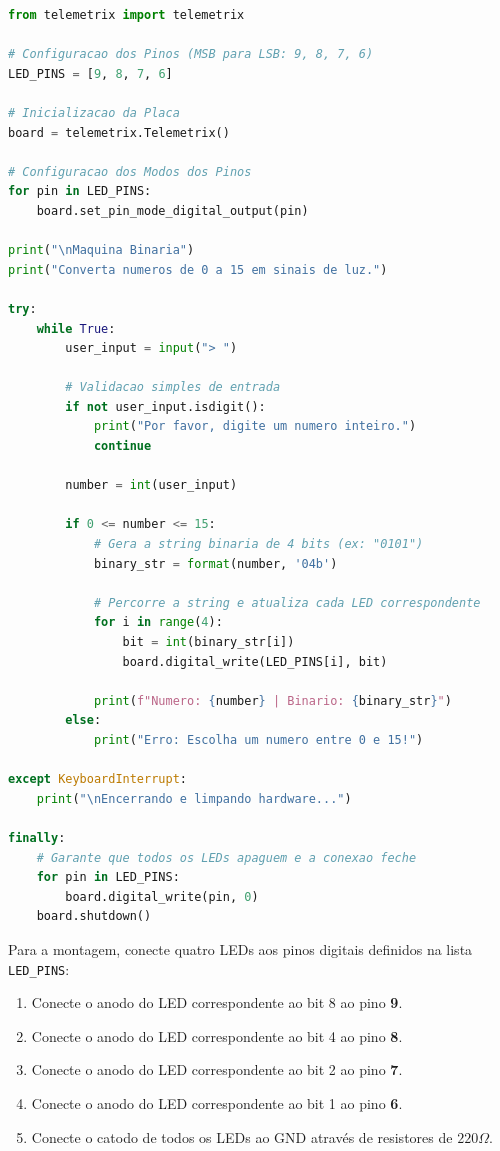 \documentclass[lang=pt,11pt]{elegantbook}
\begin{document}
\begin{lstlisting}[language=Python, showstringspaces=false]
from telemetrix import telemetrix

# Configuracao dos Pinos (MSB para LSB: 9, 8, 7, 6)
LED_PINS = [9, 8, 7, 6]

# Inicializacao da Placa
board = telemetrix.Telemetrix()

# Configuracao dos Modos dos Pinos
for pin in LED_PINS:
    board.set_pin_mode_digital_output(pin)

print("\nMaquina Binaria")
print("Converta numeros de 0 a 15 em sinais de luz.")

try:
    while True:
        user_input = input("> ")

        # Validacao simples de entrada
        if not user_input.isdigit():
            print("Por favor, digite um numero inteiro.")
            continue

        number = int(user_input)

        if 0 <= number <= 15:
            # Gera a string binaria de 4 bits (ex: "0101")
            binary_str = format(number, '04b')

            # Percorre a string e atualiza cada LED correspondente
            for i in range(4):
                bit = int(binary_str[i])
                board.digital_write(LED_PINS[i], bit)

            print(f"Numero: {number} | Binario: {binary_str}")
        else:
            print("Erro: Escolha um numero entre 0 e 15!")

except KeyboardInterrupt:
    print("\nEncerrando e limpando hardware...")

finally:
    # Garante que todos os LEDs apaguem e a conexao feche
    for pin in LED_PINS:
        board.digital_write(pin, 0)
    board.shutdown()
\end{lstlisting}

Para a montagem, conecte quatro LEDs aos pinos digitais definidos na lista \lstinline{LED_PINS}:
\begin{enumerate}
    \item Conecte o anodo do LED correspondente ao bit 8 ao pino \textbf{9}.
    \item Conecte o anodo do LED correspondente ao bit 4 ao pino \textbf{8}.
    \item Conecte o anodo do LED correspondente ao bit 2 ao pino \textbf{7}.
    \item Conecte o anodo do LED correspondente ao bit 1 ao pino \textbf{6}.
    \item Conecte o catodo de todos os LEDs ao GND através de resistores de $220\Omega$.
\end{enumerate}
\end{document}
